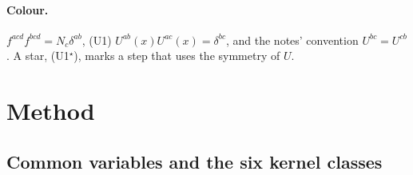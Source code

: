 \documentclass[10pt]{article}
\numberwithin{equation}{section}
\begin{document}
\paragraph{Colour.} $f^{acd}f^{bcd}=N_c\delta^{ab}$, (U1) $U^{ab}(x)U^{ac}(x)=\delta^{bc}$, and the notes' convention $U^{bc}=U^{cb}$. A star, (U1$^\star$), marks a step that uses the symmetry of $U$.

\section{Method}\label{sec:method}

\subsection{Common variables and the six kernel classes}\label{sec:classes}
\end{document}
